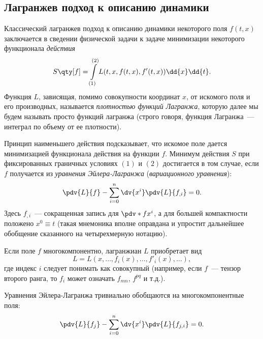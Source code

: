 \documentclass[\docroot/reports/draft/report.tex]{subfiles}
\begin{document}
\onlyinsubfile{\tableofcontents}

\subsection{Лагранжев подход к описанию динамики}

    Классический лагранжев подход к описанию динамики некоторого поля $f(t,x)$ заключается в сведении физической задачи к задаче минимизации некоторого функционала \textit{действия} \cite{landau_v1}
    \begin{equation*}
        S\qty[f] = \int\limits_{(1)}^{(2)} L(t, x, f(t,x), f'(t,x)) \dd{x}\dd{t}.
    \end{equation*}
    Функция $L$, зависящая, помимо совокупности координат $x$, от искомого поля и его производных, называется \textit{плотностью функций Лагранжа}, которую далее мы будем называть просто функций лагранжа (строго говоря, функция Лагранжа~--- интеграл по объему от ее плотности).

    Принцип наименьшего действия подсказывает, что искомое поле дается минимизацией функционала действия на функции $f$. Минимум действия $S$ при фиксированных граничных условиях $(1)$ и $(2)$ достигается в том случае, если $f$ получается из \textit{уравнения Эйлера-Лагранжа} (\textit{вариационного уравнения}):
    \begin{equation*}
        \pdv{L}{f} - \sum\limits_{i=0}^{n} \dv{x^i}\pdv{L}{f_{,i}} = 0 .
    \end{equation*}
    Здесь $f_{,i}$~--- сокращенная запись для $\pdv*{f}{x^i}$, а для большей компактности положено $x^0 \equiv t$ (такая мнемоника вполне оправдана и упростит дальнейшее обобщение сказанного на четырехмерную нотацию).

    Если поле $f$ многокомпонентно, лагранжиан $L$ приобретает вид
    \begin{equation*}
        L = L(x, \dots, f_i(x), \dots, f'_i(x), \dots),
    \end{equation*}
    где индекс $i$ следует понимать как совокупный (например, если $f$~--- тензор второго ранга, то $f_i$ может означать $f_{mn}$, $f^{pq}$ и т.д.).

    Уравнения Эйлера-Лагранжа тривиально обобщаются на многокомпонентные поля:
    \begin{equation*}
        \pdv{L}{f_j} - \sum\limits_{i=0}^{n} \dv{x^i}\pdv{L}{f_{j,i}} = 0 .
    \end{equation*}
\end{document}
